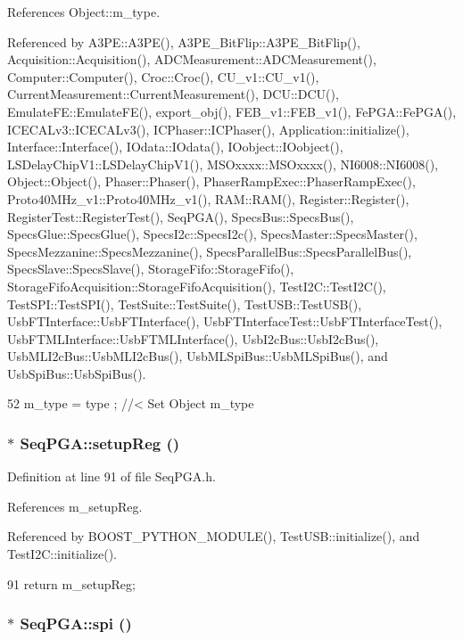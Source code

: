References Object::m\_\-type.

Referenced by A3PE::A3PE(), A3PE\_\-BitFlip::A3PE\_\-BitFlip(), Acquisition::Acquisition(), ADCMeasurement::ADCMeasurement(), Computer::Computer(), Croc::Croc(), CU\_\-v1::CU\_\-v1(), CurrentMeasurement::CurrentMeasurement(), DCU::DCU(), EmulateFE::EmulateFE(), export\_\-obj(), FEB\_\-v1::FEB\_\-v1(), FePGA::FePGA(), ICECALv3::ICECALv3(), ICPhaser::ICPhaser(), Application::initialize(), Interface::Interface(), IOdata::IOdata(), IOobject::IOobject(), LSDelayChipV1::LSDelayChipV1(), MSOxxxx::MSOxxxx(), NI6008::NI6008(), Object::Object(), Phaser::Phaser(), PhaserRampExec::PhaserRampExec(), Proto40MHz\_\-v1::Proto40MHz\_\-v1(), RAM::RAM(), Register::Register(), RegisterTest::RegisterTest(), SeqPGA(), SpecsBus::SpecsBus(), SpecsGlue::SpecsGlue(), SpecsI2c::SpecsI2c(), SpecsMaster::SpecsMaster(), SpecsMezzanine::SpecsMezzanine(), SpecsParallelBus::SpecsParallelBus(), SpecsSlave::SpecsSlave(), StorageFifo::StorageFifo(), StorageFifoAcquisition::StorageFifoAcquisition(), TestI2C::TestI2C(), TestSPI::TestSPI(), TestSuite::TestSuite(), TestUSB::TestUSB(), UsbFTInterface::UsbFTInterface(), UsbFTInterfaceTest::UsbFTInterfaceTest(), UsbFTMLInterface::UsbFTMLInterface(), UsbI2cBus::UsbI2cBus(), UsbMLI2cBus::UsbMLI2cBus(), UsbMLSpiBus::UsbMLSpiBus(), and UsbSpiBus::UsbSpiBus().


\begin{DoxyCode}
52 { m_type  = type  ; } //< Set Object m_type
\end{DoxyCode}
\hypertarget{classSeqPGA_a83598ab914c8e3ee5afa34c5e6e7fdf4}{
\subsubsection[{setupReg}]{$\ast$ SeqPGA::setupReg ()}}
\label{classSeqPGA_a83598ab914c8e3ee5afa34c5e6e7fdf4}


Definition at line 91 of file SeqPGA.h.

References m\_\-setupReg.

Referenced by BOOST\_\-PYTHON\_\-MODULE(), TestUSB::initialize(), and TestI2C::initialize().


\begin{DoxyCode}
91 { return m_setupReg;  }
\end{DoxyCode}
\hypertarget{classSeqPGA_a9c6993bb241b4cc474d525f65696099a}{
\subsubsection[{spi}]{$\ast$ SeqPGA::spi ()}}
\label{classSeqPGA_a9c6993bb241b4cc474d525f65696099a}


